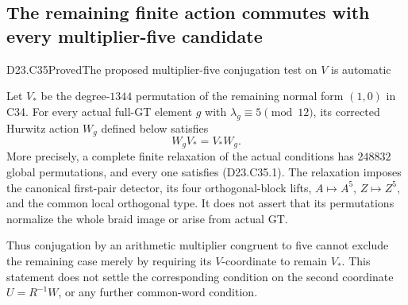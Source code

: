 \subsection{The remaining finite action commutes with every multiplier-five candidate}

\begin{statement}{D23.C35}{Proved}{The proposed multiplier-five conjugation test on $V$ is automatic}
\end{statement}
Let $V_*$ be the degree-$1344$ permutation of the remaining
normal form $(1,0)$ in C34. For every actual full-GT element
$g$ with $\lambda_g\equiv5\pmod {12}$, its corrected Hurwitz
action $W_g$ defined below satisfies
\[
                         W_gV_*=V_*W_g.
\tag{D23.C35.1}
\]
More precisely, a complete finite relaxation of the actual
conditions has $248832$ global permutations, and every one
satisfies (D23.C35.1). The relaxation imposes the canonical
first-pair detector, its four orthogonal-block lifts,
$A\mapsto A^5$, $Z\mapsto Z^5$, and the common local
orthogonal type. It does not assert that its permutations
normalize the whole braid image or arise from actual GT.

Thus conjugation by an arithmetic multiplier congruent to
five cannot exclude the remaining case merely by requiring
its $V$-coordinate to remain $V_*$. This statement does not
settle the corresponding condition on the second coordinate
$U=R^{-1}W$, or any further common-word condition.

